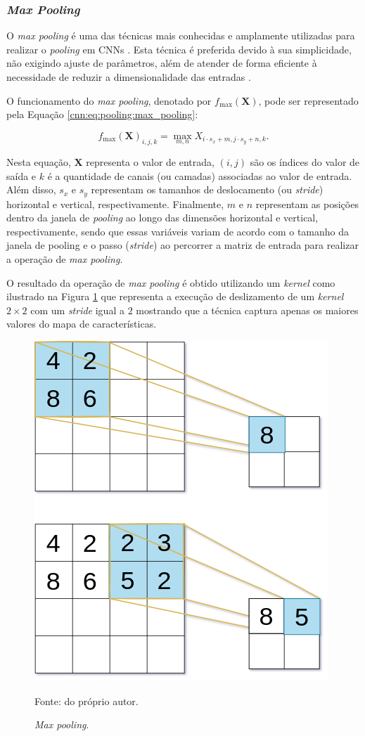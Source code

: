 \subsubsection{\textit{Max Pooling}}
\label{cnn:pooling:max_pooling}
O \textit{max pooling} é uma das técnicas mais conhecidas e amplamente utilizadas para realizar o \textit{pooling} em CNNs \citep{Zafar2022ANetworks, Paul2019DimensionalityPooling}. Esta técnica é preferida devido à sua simplicidade, não exigindo ajuste de parâmetros, além de atender de forma eficiente à necessidade de reduzir a dimensionalidade das entradas \citep{Boureau2010ARecognition}.

O funcionamento do \textit{max pooling}, denotado por $f_{\max}(\boldsymbol{X})$, pode ser representado pela Equação \ref{cnn:eq:pooling:max_pooling}:

\begin{equation}
\label{cnn:eq:pooling:max_pooling}
f_{\max}(\boldsymbol{X})_{i, j, k} = \max_{m, n} X_{i \cdot s_x + m, j \cdot s_{y} + n, k}.
\end{equation}

Nesta equação, $\boldsymbol{X}$ representa o valor de entrada, $(i, j)$ são os índices do valor de saída e $k$ é a quantidade de canais (ou camadas) associadas ao valor de entrada. Além disso, $s_{x}$ e $s_{y}$ representam os tamanhos de deslocamento (ou \textit{stride}) horizontal e vertical, respectivamente. Finalmente, $m$ e $n$ representam as posições dentro da janela de \textit{pooling} ao longo das dimensões horizontal e vertical, respectivamente, sendo que essas variáveis variam de acordo com o tamanho da janela de pooling e o passo (\textit{stride}) ao percorrer a matriz de entrada para realizar a operação de \textit{max pooling}.

O resultado da operação de \textit{max pooling} é obtido utilizando um \textit{kernel} como ilustrado na Figura \ref{cnn:fig:7} que representa a execução de deslizamento de um \textit{kernel} $2 \times 2$ com um \textit{stride} igual a $2$ mostrando que a técnica captura apenas os maiores valores do mapa de características.

\begin{figure}[H]
    \centering
    \caption{\textit{Max pooling}.}
    \includegraphics[width=0.5\linewidth]{recursos/imagens/deep/max_pooling.png}
    \label{cnn:fig:7}

    Fonte: do próprio autor.
\end{figure}

